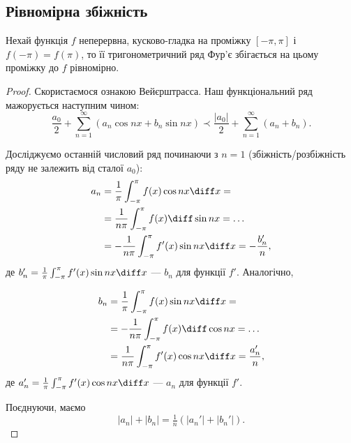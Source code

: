 \subsection{Рівномірна збіжність}

\begin{theorem}
    Нехай функція $f$ неперервна, кусково-гладка на проміжку $[-\pi, \pi]$ і $f(-\pi) = f(\pi)$, то її тригонометричний ряд Фур'є збігається на цьому проміжку до $f$ рівномірно.
\end{theorem}
\begin{proof}
    Скористаємося ознакою Вейєрштрасса. Наш функціональний ряд мажорується наступним чином:
    \begin{equation}
        \frac{a_0}{2} + \sum_{n = 1}^\infty (a_n \cos n x + b_n \sin n x) \prec \frac{|a_0|}{2} + \sum_{n = 1}^\infty (a_n + b_n).
    \end{equation}

    Досліджуємо останній числовий ряд починаючи з $n = 1$ (збіжність/розбіжність ряду не залежить від сталої $a_0$):
    \begin{equation}
        \begin{aligned}
            a_n 
            &= \frac{1}{\pi} \int_{-\pi}^\pi f(x) \cos n x \diff x = \\
            &= \frac{1}{n \pi} \int_{-\pi}^\pi f(x) \diff \sin n x = \ldots \\
            &= -\frac{1}{n \pi} \int_{-\pi}^\pi f'(x) \sin n x \diff x = -\frac{b_n'}{n},
        \end{aligned}
    \end{equation}
    де $b_n' = \frac{1}{\pi} \int_{-\pi}^\pi f'(x) \sin n x \diff x$ --- $b_n$ для функції $f'$. Аналогічно,

    \begin{equation}
        \begin{aligned}
            b_n
            &= \frac{1}{\pi} \int_{-\pi}^\pi f(x) \sin n x \diff x = \\
            &= -\frac{1}{n \pi} \int_{-\pi}^\pi f(x) \diff \cos n x = \ldots \\
            &= \frac{1}{n \pi} \int_{-\pi}^\pi f'(x) \cos n x \diff x = \frac{a_n'}{n},
        \end{aligned}
    \end{equation}
    де $a_n' = \frac{1}{\pi} \int_{-\pi}^\pi f'(x) \cos n x \diff x$ --- $a_n$ для функції $f'$. \medskip

    Поєднуючи, маємо 
    \begin{equation}
        \label{eq:}
        |a_n| + |b_n| = \tfrac{1}{n} \left( |a_n'| + |b_n'| \right).
    \end{equation}


\end{proof}
